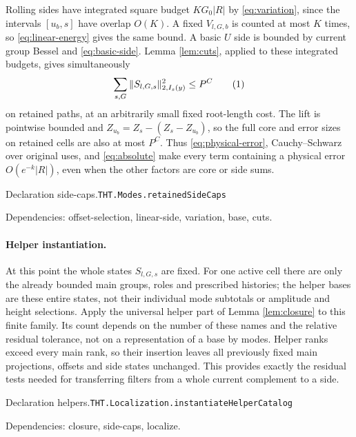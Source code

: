 \documentclass[11pt]{article}
\theoremstyle{definition}
\newcommand{\eqtag}[1]{\refstepcounter{equation}\tag{\theequation}\label{#1}}
\numberwithin{equation}{section}
\newcommand{\bp}[3]{\par\smallskip\begingroup\footnotesize
\noindent\hypertarget{bp:#1}{\textsf{Declaration #1.}}\quad\nolinkurl{#2}\par
\noindent\textsf{Dependencies:} #3.\par\endgroup\smallskip}
\begin{document}
Rolling sides have integrated square budget $KG_0|R|$ by \eqref{eq:variation}, since the intervals $[u_b,s]$ have overlap $O(K)$. A fixed $V_{l,G,b}$ is counted at most $K$ times, so \eqref{eq:linear-energy} gives the same bound. A basic $U$ side is bounded by current group Bessel and \eqref{eq:basic-side}. Lemma \ref{lem:cuts}, applied to these integrated budgets, gives simultaneously
\[
 \sum_{s,G}\|S_{l,G,s}\|_{2,I_s(y)}^2\le P^C
 \eqtag{eq:side-cap}
\]
on retained paths, at an arbitrarily small fixed root-length cost. The lift is pointwise bounded and $Z_{u_b}=Z_s-(Z_s-Z_{u_b})$, so the full core and error sizes on retained cells are also at most $P^C$. Thus \eqref{eq:physical-error}, Cauchy--Schwarz over original uses, and \eqref{eq:absolute} make every term containing a physical error $O(e^{-k}|R|)$, even when the other factors are core or side sums.

\bp{side-caps}{THT.Modes.retainedSideCaps}{offset-selection, linear-side, variation, base, cuts}
\paragraph{Helper instantiation.}
At this point the whole states $S_{l,G,s}$ are fixed. For one active cell there are only the already bounded main groups, roles and prescribed histories; the helper bases are these entire states, not their individual mode subtotals or amplitude and height selections. Apply the universal helper part of Lemma \ref{lem:closure} to this finite family. Its count depends on the number of these names and the relative residual tolerance, not on a representation of a base by modes. Helper ranks exceed every main rank, so their insertion leaves all previously fixed main projections, offsets and side states unchanged. This provides exactly the residual tests needed for transferring filters from a whole current complement to a side.
\bp{helpers}{THT.Localization.instantiateHelperCatalog}{closure, side-caps, localize}
\end{document}
